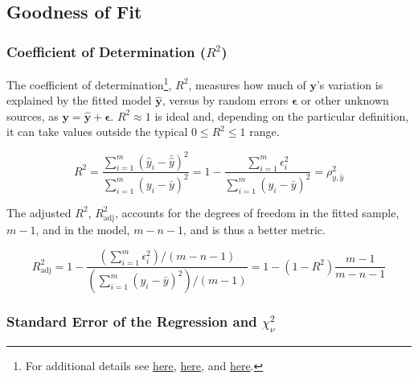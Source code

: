 \subsection{Goodness of Fit}
\label{regression:linear:goodness_of_fit}

\subsubsection{Coefficient of Determination ($R^{2}$)}
\label{regression:linear:goodness_of_fit:R2}

The coefficient of determination\footnote{For additional details see
\href{https://economictheoryblog.com/2014/11/05/the-coefficient-of-determination-latex-r2/}{here},
\href{https://economictheoryblog.com/2014/11/05/proof/}{here}, and
\href{http://people.duke.edu/~rnau/rsquared.htm}{here}.}, $R^{2}$,
measures how much of $\mathbf{y}$'s variation is explained by the fitted model $\hat{\mathbf{y}}$,
versus by random errors $\mathbf{\epsilon}$ or other unknown sources,
as $\mathbf{y} = \hat{\mathbf{y}} + \mathbf{\epsilon}$.
$R^{2} \approx 1$ is ideal and, depending on the particular definition,
it can take values outside the typical $0 \leq R^{2} \leq 1$ range.

\begin{equation}\label{eq:regression:linear:goodness_of_fit:R2}
R^{2} = \frac{
\sum_{i=1}^{m} \left(\hat{y}_{i} - \bar{\hat{y}}\right)^{2}
}{
\sum_{i=1}^{m} \left(y_{i} - \bar{y}\right)^{2}
} = 1 - \frac{
\sum_{i=1}^{m} \epsilon_{i}^{2}
}{
\sum_{i=1}^{m} \left(y_{i} - \bar{y}\right)^{2}
} = \rho_{y,\hat{y}}^{2}
\end{equation}

The adjusted $R^{2}$, $R^{2}_{\text{adj}}$, accounts for the degrees of freedom in the
fitted sample, $m-1$, and in the model, $m-n-1$, and is thus a better metric.

\begin{equation}\label{eq:regression:linear:goodness_of_fit:R2_adj}
R^{2}_{\text{adj}} = 1 - \frac{
\left(\sum_{i=1}^{m} \epsilon_{i}^{2}\right)/\left(m-n-1\right)
}{
\left(\sum_{i=1}^{m} \left(y_{i} - \bar{y}\right)^{2}\right)/\left(m-1\right)
}
= 1 - \left(1-R^{2}\right)\frac{m-1}{m-n-1}
\end{equation}

\subsubsection{Standard Error of the Regression and $\chi_{\nu}^{2}$}
\label{regression:linear:goodness_of_fit:reduced_chi2}

